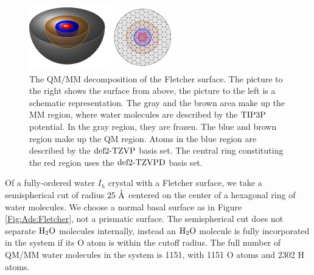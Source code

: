 \documentclass[8.5pt,twoside,twocolumn]{article}
\renewcommand{\Ang}{\mathring{\te{A}}}
\theoremstyle{standard}
\begin{document}
\begin{figure}[ht]
\centering
\includegraphics[width=\textwidth]{TikzPics/TikzCreation/SurfaceQMMM/SurfaceQMMMAside.pdf}
\newline
\caption{The QM/MM decomposition of the Fletcher surface. The picture to the right shows the surface from above,
the picture to the left is a schematic representation. The gray and the brown area make up the MM region,
where water molecules are described by the $\text{TIP3P}$ potential. In the gray region, they are frozen. 
The blue and brown region make up the QM region. Atoms in the blue region are described by the
$\text{def2-TZVP}$ basis set. The central ring constituting the red region uses the $\text{def2-TZVPD}$ basis set.}
\label{Fig:Ads:QMMM}
\end{figure}

Of a fully-ordered water $I_h$ crystal with a Fletcher surface, we take
a semispherical cut of radius $25~\Ang$ centered on the center of a hexagonal
ring of water molecules. We choose a normal basal surface as in
Figure \ref{Fig:Ads:Fletcher}, not a prismatic surface. The semispherical
cut does not separate $\text H _2 \text O$ molecules internally, instead an $\text H _2 \text O$ molecule
is fully incorporated in the system if its O atom is within the cutoff
radius. The full number of QM/MM water molecules in the system is
1151, with 1151 O atoms and 2302 H atoms.
\end{document}

